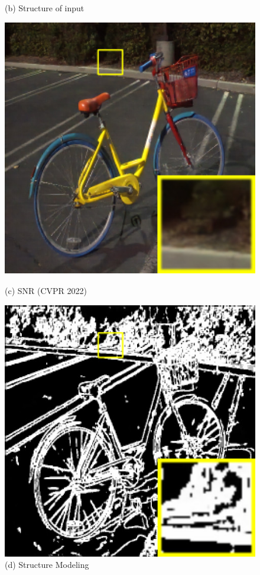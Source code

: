 \documentclass[CJK,aspectratio=169]{beamer}  %
\begin{document}
\begin{frame}
\begin{figure}
\begin{minipage}{.58\columnwidth}
\begin{minipage}{.3\textwidth}
				\caption*{\tiny (b) Structure of input}
			\end{minipage}
			\begin{minipage}{.3\textwidth}
				\centering
				\includegraphics[width=.8\linewidth]{picture/LLIE/Structure Modeling and Guidance/SNR (CVPR 2022)}
				\caption*{\tiny (c) SNR (CVPR 2022)}
			\end{minipage}
			\begin{minipage}{.3\textwidth}
				\centering
				\includegraphics[width=.8\linewidth]{picture/LLIE/Structure Modeling and Guidance/Structure Modeling}
				\caption*{\tiny (d) Structure Modeling}

\end{minipage}
\end{minipage}
\end{figure}
\end{frame}
\end{document}

